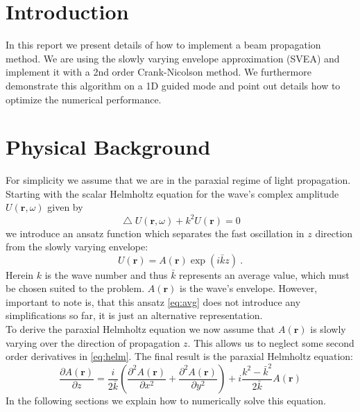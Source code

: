 \documentclass[a4paper,12pt]{scrartcl}
\title{\titel}
\author{\Large{Anne \textsc{Weber}, Felix \textsc{Wechsler}, Mingxuan \textsc{Zhang}}\\  \large{Group 4}}
\date{\large{\today}}
\newcommand\lap{\mathop{{}\bigtriangleup}\nolimits}
\begin{document}
    \maketitle
	\thispagestyle{empty}
	\newpage
	\setcounter{page}{1}
	\tableofcontents

\newpage
\section{Introduction}
   In this report we present details of how to implement a beam propagation method.
   We are using the slowly varying envelope approximation (SVEA) and implement
   it with a 2nd order Crank-Nicolson method.
   We furthermore demonstrate this algorithm on a 1D guided mode 
   and point out details how to optimize the numerical performance.

\section{Physical Background}
    For simplicity we assume that we are in the paraxial regime of light propagation.
    Starting with the scalar Helmholtz equation for the wave's complex amplitude $U(\mathbf{r}, \omega)$ given by
    \begin{equation}
        \lap U(\mathbf{r}, \omega) + k^2 U(\mathbf r) = 0
        \label{eq:helm}
    \end{equation}
    we introduce an ansatz function which separates the fast oscillation in $z$ direction from the slowly varying envelope:
    \begin{equation}
        U(\mathbf r) = A(\mathbf r) \exp( i \bar k z) ~.
        \label{eq:avg}
    \end{equation}
    Herein $k$ is the wave number and thus $\bar k$ represents an average value, which must be chosen suited to the problem.
    $A(\mathbf r)$ is the wave's envelope. %
    However, important to note is, that this ansatz \autoref {eq:avg} does not introduce any simplifications
    so far, it is just an alternative representation.\\
    To derive the paraxial Helmholtz equation we now assume that $A(\mathbf r)$ is slowly varying over the direction of propagation $z$. This allows us to neglect some second order derivatives in \autoref{eq:helm}. The final result is the paraxial Helmholtz equation:
    \begin{equation}
        \frac{\partial A(\mathbf{r})}{\partial z} = \frac{i}{2\bar k} \left(\frac{\partial^2 A(\mathbf{r})}{\partial x^2} + \frac{\partial^2 A(\mathbf{r})}{\partial y^2}\right)
        + i \frac{k^2 - \bar k^2}{2 \bar k} A(\mathbf r) 
        \label{eq:final}
    \end{equation}
    In the following sections we explain how to numerically solve this equation.
 
\end{document}
